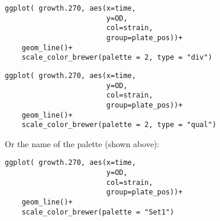 \documentclass[11pt]{article}
\begin{document}
\begin{verbatim}
ggplot( growth.270, aes(x=time,
                        y=OD,
                        col=strain,
                        group=plate_pos))+
    geom_line()+
    scale_color_brewer(palette = 2, type = "div")
\end{verbatim}


\begin{verbatim}
ggplot( growth.270, aes(x=time,
                        y=OD,
                        col=strain,
                        group=plate_pos))+
    geom_line()+
    scale_color_brewer(palette = 2, type = "qual")
\end{verbatim}



Or the name of the palette (shown above):

\begin{verbatim}
ggplot( growth.270, aes(x=time,
                        y=OD,
                        col=strain,
                        group=plate_pos))+
    geom_line()+
    scale_color_brewer(palette = "Set1")
\end{verbatim}
\end{document}
